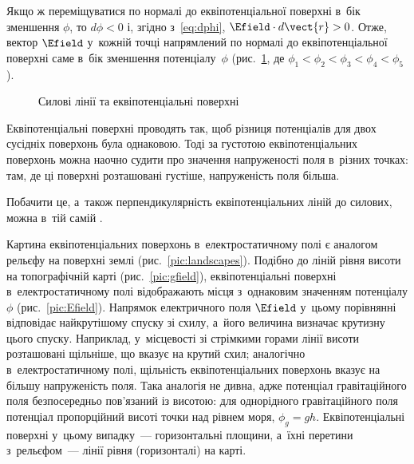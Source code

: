 Якщо ж переміщуватися по нормалі до еквіпотенціальної поверхні в~бік зменшення $\phi$, то
$d\phi < 0$ і, згідно з~\eqref{eq:dphi}, $\Efield\cdot d\vect{r} > 0$. Отже, вектор
$\Efield$ у~кожній точці напрямлений по нормалі до еквіпотенціальної поверхні саме в~бік
зменшення потенціалу~$\phi$ (рис.~\ref{tikz:equipotential}, де
$\phi_1 < \phi_2 < \phi_3 < \phi_4 < \phi_5$).

\begin{figure}%
	\centering
	\caption{Силові лінії та еквіпотенціальні поверхні}
	\label{tikz:equipotential}
\end{figure}

Еквіпотенціальні поверхні проводять так, щоб різниця потенціалів для двох сусідніх поверхонь
була однаковою. Тоді за густотою еквіпотенціальних поверхонь можна наочно судити про
значення напруженості поля в~різних точках: там, де ці поверхні розташовані густіше,
напруженість поля більша.

\begin{Simulation}
Побачити це, а~також перпендикулярність еквіпотенціальних ліній до
силових, можна в~тій самій .
\end{Simulation}

Картина еквіпотенціальних поверхонь в~електростатичному полі є аналогом рельєфу на
поверхні землі (рис.~\ref{pic:landscapes}). Подібно до ліній рівня висоти на топографічній
карті (рис.~\ref{pic:gfield}), еквіпотенціальні поверхні в~електростатичному полі
відображають місця з~однаковим значенням потенціалу $\phi$ (рис.~\ref{pic:Efield}).
Напрямок електричного поля $\Efield$ у~цьому порівнянні відповідає найкрутішому спуску зі
схилу, а~його величина визначає крутизну цього спуску. Наприклад, у~місцевості зі
стрімкими горами лінії висоти розташовані щільніше, що вказує на крутий схил; аналогічно
в~електростатичному полі, щільність еквіпотенціальних поверхонь вказує на більшу
напруженість поля. Така аналогія не дивна, адже потенціал гравітаційного поля
безпосередньо пов’язаний із висотою: для однорідного гравітаційного поля потенціал
пропорційний висоті точки над рівнем моря, $\phi_g = gh$. Еквіпотенціальні поверхні у~цьому
випадку~--- горизонтальні площини, а~їхні перетини з~рельєфом~--- лінії рівня
(горизонталі) на карті.

